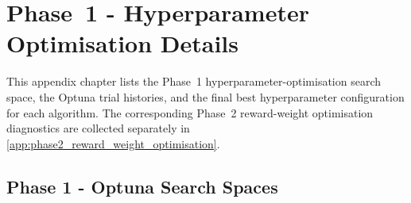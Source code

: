 \chapter{Phase~1 - Hyperparameter Optimisation Details}
\label{app:phase1_hyperparams}
This appendix chapter lists the Phase~1 hyperparameter-optimisation search space, the Optuna trial histories, and the final best hyperparameter configuration for each algorithm. The corresponding Phase~2 reward-weight optimisation diagnostics are collected separately in \autoref{app:phase2_reward_weight_optimisation}.

\section{Phase 1 - Optuna Search Spaces}
\label{app:phase1_search_spaces}

